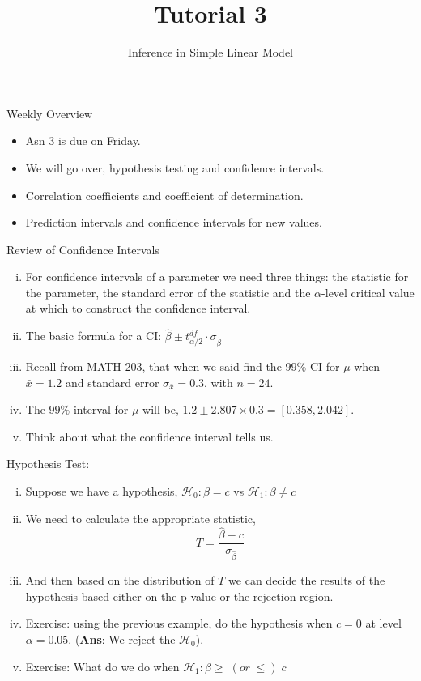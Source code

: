 \documentclass{beamer}
\title{Tutorial 3}
\subtitle{Inference in Simple Linear Model}
\begin{document}
	\frame {
		\titlepage
	}
	
	\begin{frame}{Weekly Overview}
		\begin{itemize}
			\item Asn 3 is due on Friday.
			\item We will go over, hypothesis testing and confidence intervals.
			\item Correlation coefficients and coefficient of determination.
			\item Prediction intervals and confidence intervals for new values.
		\end{itemize}
	\end{frame}
	
	\begin{frame}{Review of Confidence Intervals}
		\begin{enumerate}[i)]
			\item For confidence intervals of a parameter we need three things: the statistic for the parameter, the standard error of the statistic and the $\alpha$-level critical value at which to construct the confidence interval.
			\item The basic formula for a CI: $\hat{\beta} \pm t^{df}_{\alpha/2}\cdot\sigma_{\hat{\beta}}$
			\item Recall from MATH 203, that when we said find the $99\%$-CI for $\mu$ when $\bar{x}=1.2$ and standard error  $\sigma_{\bar{x}}=0.3$, with $n=24$.
			\item The $99\%$ interval for $\mu$ will be, $1.2\pm 2.807\times 0.3=[0.358,2.042]$. 
			\item Think about what the confidence interval tells us.
		\end{enumerate}
	\end{frame}
	
	\begin{frame}{Hypothesis Test:}
		\begin{enumerate}[i)]
			\item Suppose we have a hypothesis, $\mathcal{H}_0: \beta = c$ vs $\mathcal{H}_1: \beta \neq c$
			\item We need to calculate the appropriate statistic, $$T = \frac{\hat{\beta}-c}{\sigma_{\hat{\beta}}}$$
			\item And then based on the distribution of $T$ we can decide the results of the hypothesis based either on the p-value or the rejection region.
			\item Exercise: using the previous example, do the hypothesis when $c=0$ at level $\alpha = 0.05$. (\textbf{Ans}: We reject the $\mathcal{H}_0$).
			\item Exercise: What do we do when $\mathcal{H}_1: \beta \geq \; (or \; \leq) \;   c$
		\end{enumerate}
	\end{frame}
\end{document}
